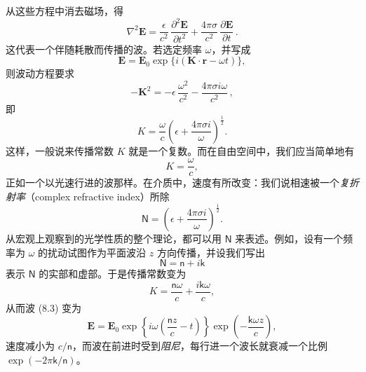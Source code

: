 从这些方程中消去磁场，得
\begin{equation*}
\nabla^2\mathbf{E} = \frac{\epsilon}{c^2}\,\frac{\partial^2\mathbf{E}}{\partial t^2} + \frac{4\pi\sigma}{c^2}\,\frac{\partial\mathbf{E}}{\partial t}\,.\tag{8.2}
\end{equation*}
这代表一个伴随耗散而传播的波。若选定频率 $\omega$，并写成
\begin{equation*}
\mathbf{E} = \mathbf{E}_0\exp\{i(\mathbf{K}\cdot\mathbf{r}-\omega t)\},\tag{8.3}
\end{equation*}
则波动方程要求
\begin{equation*}
-\mathbf{K}^2 = -\epsilon\,\frac{\omega^2}{c^2} - \frac{4\pi\sigma i\omega}{c^2}\,,\tag{8.4}
\end{equation*}
即
\begin{equation*}
K = \frac{\omega}{c}\left(\epsilon + \frac{4\pi\sigma i}{\omega}\right)^{\frac{1}{2}}.\tag{8.5}
\end{equation*}
这样，一般说来传播常数 $K$ 就是一个复数。而在自由空间中，我们应当简单地有
\begin{equation*}
K = \frac{\omega}{c},\tag{8.6}
\end{equation*}
正如一个以光速行进的波那样。在介质中，速度有所改变：我们说相速被一个\emph{复折射率}（complex refractive index）所除
\begin{equation*}
\mathsf{N} = \left(\epsilon + \frac{4\pi\sigma i}{\omega}\right)^{\frac{1}{2}}.\tag{8.7}
\end{equation*}
从宏观上观察到的光学性质的整个理论，都可以用 $\mathsf{N}$ 来表述。例如，设有一个频率为 $\omega$ 的扰动试图作为平面波沿 $z$ 方向传播，并设我们写出
\begin{equation*}
\mathsf{N} = \mathsf{n} + i\mathsf{k}\tag{8.8}
\end{equation*}
表示 $\mathsf{N}$ 的实部和虚部。于是传播常数变为
\begin{equation*}
K = \frac{\mathsf{n}\omega}{c} + \frac{i\mathsf{k}\omega}{c},\tag{8.9}
\end{equation*}
从而波 (8.3) 变为
\begin{equation*}
\mathbf{E} = \mathbf{E}_0\exp\left\{i\omega\left(\frac{\mathsf{n}z}{c} - t\right)\right\}\exp\left(-\frac{\mathsf{k}\omega z}{c}\right),\tag{8.10}
\end{equation*}
速度减小为 $c/\mathsf{n}$，而波在前进时受到\emph{阻尼}，每行进一个波长就衰减一个比例 $\exp(-2\pi\mathsf{k}/\mathsf{n})$。

